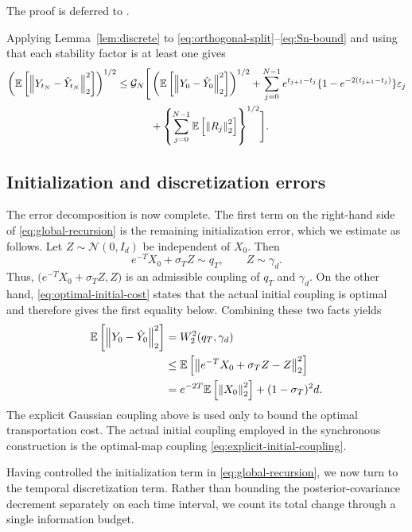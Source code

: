 \documentclass[11pt]{article}
\theoremstyle{definition}
\newcommand{\E}{\mathbb{E}}
\newcommand{\N}{\mathcal{N}}
\newcommand{\Id}{I_d}
\newcommand{\norm}[1]{\left\lVert #1\right\rVert_2}
\begin{document}
The proof is deferred to .

Applying Lemma~\ref{lem:discrete} to \eqref{eq:orthogonal-split}--\eqref{eq:Sn-bound} and using that each stability factor is at least one gives
\begin{align}
    \left(\E\left[\norm{Y_{t_N}-\hat Y_{t_N}}^2\right]\right)^{1/2}
    \le \mathcal G_N\Biggl[
       &\left(\E\left[\norm{Y_0-\hat Y_0}^2\right]\right)^{1/2}
       +\sum_{j=0}^{N-1}e^{t_{j+1}-t_j}
       \{1-e^{-2(t_{j+1}-t_j)}\}\varepsilon_j\notag\\
       &+\left\{\sum_{j=0}^{N-1}\E\left[\norm{R_j}^2\right]\right\}^{1/2}
    \Biggr].
\label{eq:global-recursion}
\end{align}

\subsection{Initialization and discretization errors}

The error decomposition is now complete. The first term on the
right-hand side of \eqref{eq:global-recursion} is the remaining
initialization error, which we estimate as follows. Let
$Z\sim\N(0,\Id)$ be independent of $X_0$. Then
\[
    e^{-T}X_0+\sigma_TZ\sim q_T,
    \qquad
    Z\sim\gamma_d.
\]
Thus,
$\bigl(e^{-T}X_0+\sigma_TZ,Z\bigr)$ is an admissible
coupling of $q_T$ and $\gamma_d$. On the other hand,
\eqref{eq:optimal-initial-cost} states that the actual initial
coupling is optimal and therefore gives the first equality below.
Combining these two facts yields
\begin{align}
    \E\left[\norm{Y_0-\hat Y_0}^2\right]
    &=
    W_2^2(q_T,\gamma_d)\notag\\
    &\le
    \E\left[
        \norm{e^{-T}X_0+\sigma_TZ-Z}^2
    \right]\notag\\
    &=
    e^{-2T}\E\left[\norm{X_0}^2\right]
    +(1-\sigma_T)^2d.
\label{eq:delta0-bound}
\end{align}
The explicit Gaussian coupling above is used only to bound the
optimal transportation cost. The actual initial coupling employed
in the synchronous construction is the optimal-map coupling
\eqref{eq:explicit-initial-coupling}.

Having controlled the initialization term in
\eqref{eq:global-recursion}, we now turn to the temporal
discretization term. Rather than bounding the posterior-covariance
decrement separately on each time interval, we count its total change
through a single information budget.
\end{document}
